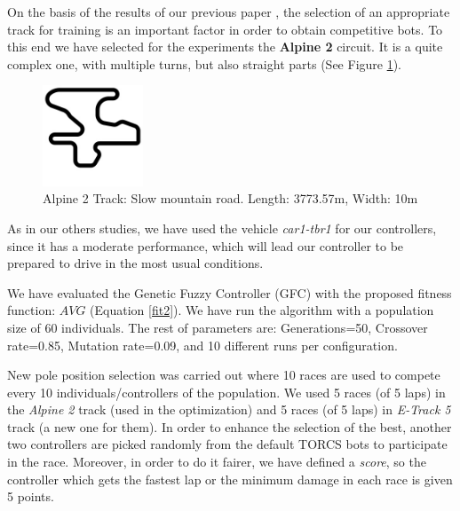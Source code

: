 \documentclass[conference]{IEEEtran}
\begin{document}

On the basis of the results of our previous paper \cite{salem_cig2018}, the selection of an appropriate track for training is an important factor in order to obtain competitive bots. To this end we have selected for the experiments the \textbf{Alpine 2} circuit. It is a quite complex one, with multiple turns, but also straight parts (See Figure \ref{fig:alpine2_track}).

\begin{figure}[!ht]	
  \begin{center}
    \includegraphics[width=3cm]{fig/alpine2.jpg}
    \caption{Alpine 2 Track: Slow mountain road. Length: 3773.57m, Width: 10m}
    \label{fig:alpine2_track}	
  \end{center}	
\end{figure}

As in our others studies, we have used the vehicle \textit{car1-tbr1} for our controllers, since it has a moderate performance, which will lead our controller to be prepared to drive in the most usual conditions.

We have evaluated the Genetic Fuzzy Controller (GFC) with the proposed fitness function: $AVG$ (Equation \ref{fit2}). We have run the algorithm with a population size of 60 individuals. The rest of parameters are: Generations=50, Crossover rate=0.85, Mutation rate=0.09, and 10 different runs per configuration.

New pole position selection was carried out where 10 races are used to compete every 10 individuals/controllers of the population.
We used 5 races (of 5 laps) in the \textit{Alpine 2} track (used in the optimization) and 5 races (of 5 laps) in \textit{E-Track 5} track (a new one for them). 
In order to enhance the selection of the best, another two controllers are picked randomly from the default TORCS bots to participate in the race. Moreover, in order to do it fairer, we have defined a \textit{score}, so the controller which gets the fastest lap or the minimum damage in each race is given 5 points.
\end{document}
